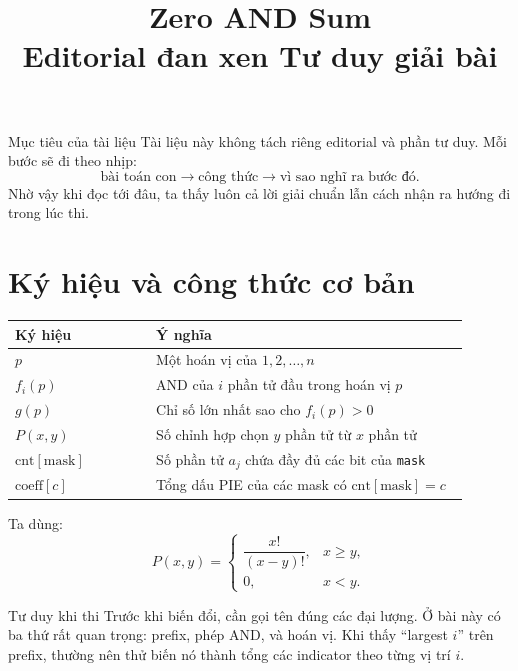 \documentclass[12pt]{article}
\title{\vspace{-1.5em}\textbf{Zero AND Sum}\\[0.25em]\large Editorial đan xen Tư duy giải bài}
\author{}
\date{}
\newcommand{\cnt}{\mathrm{cnt}}
\newcommand{\coef}{\mathrm{coeff}}
\newcommand{\msk}{\mathrm{mask}}
\begin{document}
\maketitle
\thispagestyle{fancy}

\begin{plainbox}{Mục tiêu của tài liệu}
Tài liệu này không tách riêng editorial và phần tư duy. Mỗi bước sẽ đi theo nhịp:
\[
\text{bài toán con} \longrightarrow \text{công thức} \longrightarrow \text{vì sao nghĩ ra bước đó}.
\]
Nhờ vậy khi đọc tới đâu, ta thấy luôn cả lời giải chuẩn lẫn cách nhận ra hướng đi trong lúc thi.
\end{plainbox}

\section{Ký hiệu và công thức cơ bản}

\begin{center}
\begin{tabular}{>{\raggedright\arraybackslash}p{0.28\linewidth} p{0.62\linewidth}}
\toprule
Ký hiệu & Ý nghĩa \\
\midrule
\(p\) & Một hoán vị của \(1,2,\ldots,n\) \\
\(f_i(p)\) & AND của \(i\) phần tử đầu trong hoán vị \(p\) \\
\(g(p)\) & Chỉ số lớn nhất sao cho \(f_i(p)>0\) \\
\(P(x,y)\) & Số chỉnh hợp chọn \(y\) phần tử từ \(x\) phần tử \\
\(\cnt[\msk]\) & Số phần tử \(a_j\) chứa đầy đủ các bit của \texttt{mask} \\
\(\coef[c]\) & Tổng dấu PIE của các mask có \(\cnt[\msk]=c\) \\
\bottomrule
\end{tabular}
\end{center}

Ta dùng:
\[
P(x,y)=
\begin{cases}
\dfrac{x!}{(x-y)!}, & x\ge y,\\
0, & x<y.
\end{cases}
\]

\begin{thinkbox}{Tư duy khi thi}
Trước khi biến đổi, cần gọi tên đúng các đại lượng. Ở bài này có ba thứ rất quan trọng: prefix, phép AND, và hoán vị. Khi thấy ``largest \(i\)'' trên prefix, thường nên thử biến nó thành tổng các indicator theo từng vị trí \(i\).
\end{thinkbox}
\end{document}
